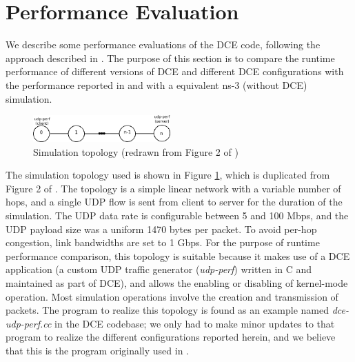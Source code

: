 \documentclass{sig-alternate}
\begin{document}

\section{Performance Evaluation}
We describe some performance evaluations of the DCE code, following the
approach described in \cite{Tazaki13}.  The purpose of this section is to
compare the runtime performance of different versions of DCE and different
DCE configurations with the performance reported in \cite{Tazaki13} and with
a equivalent ns-3 (without DCE) simulation.

\begin{figure}[h!]
  \centering
    \includegraphics[width=0.47\textwidth]{figs/topology.png}
  \caption{Simulation topology (redrawn from Figure 2 of \cite{Tazaki13})}
  \label{fig:topology}
\end{figure}

The simulation topology used is shown in Figure \ref{fig:topology}, which
is duplicated from Figure 2 of \cite{Tazaki13}.  The topology is a simple
linear network with a variable number of hops, and a single UDP flow
is sent from client to server for the duration of the simulation.
The UDP data rate is configurable between 5 and 100 Mbps, and the UDP
payload size was a uniform 1470 bytes per packet.
To avoid per-hop congestion, link bandwidths are set to 1 Gbps.
For the purpose of runtime performance comparison, this topology is
suitable because it makes use of a DCE application (a custom UDP traffic
generator (\emph{udp-perf}) written in C and maintained as part of DCE),
and allows the enabling or disabling of kernel-mode operation.  Most
simulation operations involve the creation and transmission of packets.
The program to realize this topology is found as an example named
\emph{dce-udp-perf.cc} in the DCE codebase; we only had to make minor
updates to that program to realize the different configurations reported
herein, and we believe that this is the program originally used
in \cite{Tazaki13}.
\end{document}
